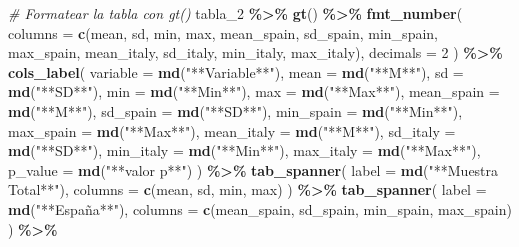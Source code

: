 \documentclass[
]{article}
\newenvironment{Shaded}{\begin{snugshade}}{\end{snugshade}}
\newcommand{\AttributeTok}[1]{\textcolor[rgb]{0.13,0.29,0.53}{#1}}
\newcommand{\CommentTok}[1]{\textcolor[rgb]{0.56,0.35,0.01}{\textit{#1}}}
\newcommand{\DecValTok}[1]{\textcolor[rgb]{0.00,0.00,0.81}{#1}}
\newcommand{\FunctionTok}[1]{\textcolor[rgb]{0.13,0.29,0.53}{\textbf{#1}}}
\newcommand{\NormalTok}[1]{#1}
\newcommand{\SpecialCharTok}[1]{\textcolor[rgb]{0.81,0.36,0.00}{\textbf{#1}}}
\newcommand{\StringTok}[1]{\textcolor[rgb]{0.31,0.60,0.02}{#1}}
\begin{document}
\begin{Shaded}
\begin{Highlighting}[]
\CommentTok{\# Formatear la tabla con gt()}
\NormalTok{tabla\_2 }\SpecialCharTok{\%\textgreater{}\%}
  \FunctionTok{gt}\NormalTok{() }\SpecialCharTok{\%\textgreater{}\%}
  \FunctionTok{fmt\_number}\NormalTok{(}
    \AttributeTok{columns =} \FunctionTok{c}\NormalTok{(mean, sd, min, max,}
\NormalTok{                mean\_spain, sd\_spain, min\_spain, max\_spain,}
\NormalTok{                mean\_italy, sd\_italy, min\_italy, max\_italy),}
    \AttributeTok{decimals =} \DecValTok{2}
\NormalTok{  ) }\SpecialCharTok{\%\textgreater{}\%}
\FunctionTok{cols\_label}\NormalTok{(}
  \AttributeTok{variable =} \FunctionTok{md}\NormalTok{(}\StringTok{"**Variable**"}\NormalTok{),}
  \AttributeTok{mean =} \FunctionTok{md}\NormalTok{(}\StringTok{"**M**"}\NormalTok{),}
  \AttributeTok{sd =} \FunctionTok{md}\NormalTok{(}\StringTok{"**SD**"}\NormalTok{),}
  \AttributeTok{min =} \FunctionTok{md}\NormalTok{(}\StringTok{"**Min**"}\NormalTok{),}
  \AttributeTok{max =} \FunctionTok{md}\NormalTok{(}\StringTok{"**Max**"}\NormalTok{),}
  \AttributeTok{mean\_spain =} \FunctionTok{md}\NormalTok{(}\StringTok{"**M**"}\NormalTok{),}
  \AttributeTok{sd\_spain =} \FunctionTok{md}\NormalTok{(}\StringTok{"**SD**"}\NormalTok{),}
  \AttributeTok{min\_spain =} \FunctionTok{md}\NormalTok{(}\StringTok{"**Min**"}\NormalTok{),}
  \AttributeTok{max\_spain =} \FunctionTok{md}\NormalTok{(}\StringTok{"**Max**"}\NormalTok{),}
  \AttributeTok{mean\_italy =} \FunctionTok{md}\NormalTok{(}\StringTok{"**M**"}\NormalTok{),}
  \AttributeTok{sd\_italy =} \FunctionTok{md}\NormalTok{(}\StringTok{"**SD**"}\NormalTok{),}
  \AttributeTok{min\_italy =} \FunctionTok{md}\NormalTok{(}\StringTok{"**Min**"}\NormalTok{),}
  \AttributeTok{max\_italy =} \FunctionTok{md}\NormalTok{(}\StringTok{"**Max**"}\NormalTok{),}
  \AttributeTok{p\_value =} \FunctionTok{md}\NormalTok{(}\StringTok{"**valor p**"}\NormalTok{)}
\NormalTok{) }\SpecialCharTok{\%\textgreater{}\%}
  \FunctionTok{tab\_spanner}\NormalTok{(}
    \AttributeTok{label =} \FunctionTok{md}\NormalTok{(}\StringTok{"**Muestra Total**"}\NormalTok{),}
    \AttributeTok{columns =} \FunctionTok{c}\NormalTok{(mean, sd, min, max)}
\NormalTok{  ) }\SpecialCharTok{\%\textgreater{}\%}
  \FunctionTok{tab\_spanner}\NormalTok{(}
    \AttributeTok{label =} \FunctionTok{md}\NormalTok{(}\StringTok{"**España**"}\NormalTok{),}
    \AttributeTok{columns =} \FunctionTok{c}\NormalTok{(mean\_spain, sd\_spain, min\_spain, max\_spain)}
\NormalTok{  ) }\SpecialCharTok{\%\textgreater{}\%}

\end{Highlighting}
\end{Shaded}
\end{document}
